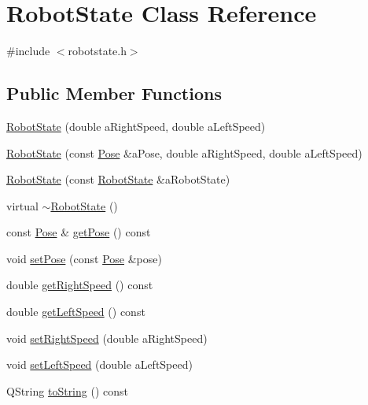 \hypertarget{classRobotState}{
\section{RobotState Class Reference}
\label{classRobotState}
}


{\ttfamily \#include $<$robotstate.h$>$}

\subsection*{Public Member Functions}
\begin{DoxyCompactItemize}
\item 
\hyperlink{classRobotState_a800a4ffc27d858c9b088d2ae249a79a5}{RobotState} (double aRightSpeed, double aLeftSpeed)
\item 
\hyperlink{classRobotState_a8cefd99462470cce08137daf21b95c50}{RobotState} (const \hyperlink{classPose}{Pose} \&aPose, double aRightSpeed, double aLeftSpeed)
\item 
\hyperlink{classRobotState_abe6933a816e40e671a6b8dd377906983}{RobotState} (const \hyperlink{classRobotState}{RobotState} \&aRobotState)
\item 
virtual \hyperlink{classRobotState_a86cf2dc3aef7d924f89d5b3e5467ea8a}{$\sim$RobotState} ()
\item 
const \hyperlink{classPose}{Pose} \& \hyperlink{classRobotState_aa3e33c3be53374c306ccc7f0ae08e001}{getPose} () const 
\item 
void \hyperlink{classRobotState_a366df5c1af35ab73ce63b56378015c87}{setPose} (const \hyperlink{classPose}{Pose} \&pose)
\item 
double \hyperlink{classRobotState_a534fa57e537c511c1c16efdfb4a61c22}{getRightSpeed} () const 
\item 
double \hyperlink{classRobotState_ab262ffc5085bf899a6a9a95460799ee5}{getLeftSpeed} () const 
\item 
void \hyperlink{classRobotState_ace09081eea29222e09347724ec68c4b6}{setRightSpeed} (double aRightSpeed)
\item 
void \hyperlink{classRobotState_a28ea140e5156b1162e28fee5284f6c50}{setLeftSpeed} (double aLeftSpeed)
\item 
QString \hyperlink{classRobotState_ac439d48f0018d84de68b4d24127ae263}{toString} () const 
\end{DoxyCompactItemize}


